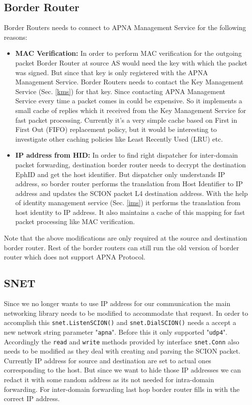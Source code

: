 \subsection{Border Router}
Border Routers needs to connect to APNA Management Service for the following reasons:
\begin{itemize}
    \item \textbf{MAC Verification:} In order to perform MAC verification for the outgoing packet Border Router at source AS would need the key with which the packet was signed. But since that key is only registered with the APNA Management Service. Border Routers needs to contact the Key Management Service (Sec. \ref{kms}) for that key. Since contacting APNA Management Service every time a packet comes in could be expensive. So it implements a small cache of replies which it received from the Key Management Service for fast packet processing. Currently it's a very simple cache based on First in First Out (FIFO) replacement policy, but it would be interesting to investigate other caching policies like Least Recently Used (LRU) etc.
    \item \textbf{IP address from HID:} In order to find right dispatcher for inter-domain packet forwarding, destination border router needs to decrypt the destination EphID and get the host identifier. But dispatcher only understands IP address, so border router performs the translation from Host Identifier to IP address and updates the SCION packet L4 destination address. With the help of identity management service (Sec. \ref{ims}) it performs the translation from host identity to IP address. It also maintains a cache of this mapping for fast packet processing like MAC verification.
\end{itemize}
Note that the above modifications are only required at the source and destination border router. Rest of the border routers can still run the old version of border router which does not support APNA Protocol.

\subsection{SNET}
Since we no longer wants to use IP address for our communication the main networking library needs to be modified to accommodate that request. In order to accomplish this \texttt{snet.ListenSCION()} and \texttt{snet.DialSCION()} needs a accept a new network string parameter "\texttt{apna}". Before this it only supported "\texttt{udp4}". Accordingly the \texttt{read} and \texttt{write} methods provided by interface \texttt{snet.Conn} also needs to be modified as they deal with creating and parsing the SCION packet. Currently IP address for source and destination are set to actual ones corresponding to the host. But since we want to hide those IP addresses we can redact it with some random address as its not needed for intra-domain forwarding. For inter-domain forwarding last hop border router fills in with the correct IP address.

